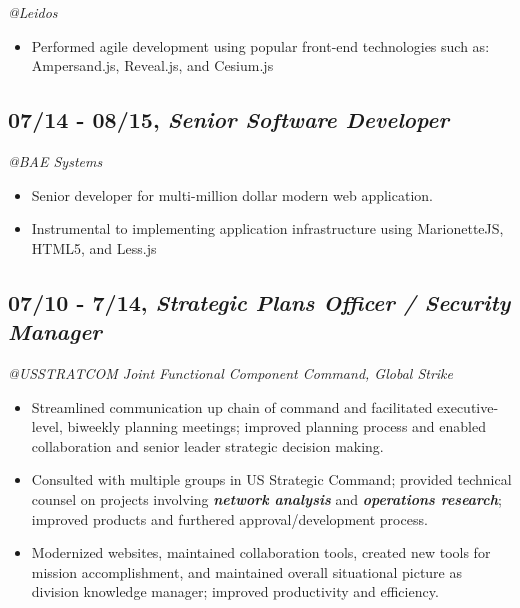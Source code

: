 \documentclass[10pt]{article}
\begin{document}
\emph{@Leidos }

\begin{itemize}
\itemsep1pt\parskip0pt
\item
  Performed agile development using popular front-end technologies such
  as: Ampersand.js, Reveal.js, and Cesium.js
\end{itemize}

\subsection{07/14 - 08/15, \textbf{\emph{Senior Software
Developer}}}\label{senior-software-developer-1}

\emph{@BAE Systems }

\begin{itemize}
\itemsep1pt\parskip0pt
\item
  Senior developer for multi-million dollar modern web application.
\item
  Instrumental to implementing application infrastructure using
  MarionetteJS, HTML5, and Less.js
\end{itemize}

\subsection{07/10 - 7/14, \textbf{\emph{Strategic Plans Officer /
Security Manager}}}\label{strategic-plans-officer-security-manager}

\emph{@USSTRATCOM Joint Functional Component Command, Global Strike}

\begin{itemize}
\itemsep1pt\parskip0pt
\item
  Streamlined communication up chain of command and facilitated
  executive-level, biweekly planning meetings; improved planning process
  and enabled collaboration and senior leader strategic decision making.
\item
  Consulted with multiple groups in US Strategic Command; provided
  technical counsel on projects involving \textbf{\emph{network
  analysis}} and \textbf{\emph{operations research}}; improved products
  and furthered approval/development process.
\item
  Modernized websites, maintained collaboration tools, created new tools
  for mission accomplishment, and maintained overall situational picture
  as division knowledge manager; improved productivity and efficiency.
\end{itemize}
\end{document}
